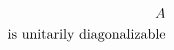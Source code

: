 \documentclass[preview]{standalone}
\begin{document}
\begin{align*}
\special{dvisvgm:raw <g id='unique000'>}A \\ \text{is unitarily diagonalizable}\special{dvisvgm:raw </g>}
\end{align*}
\end{document}
